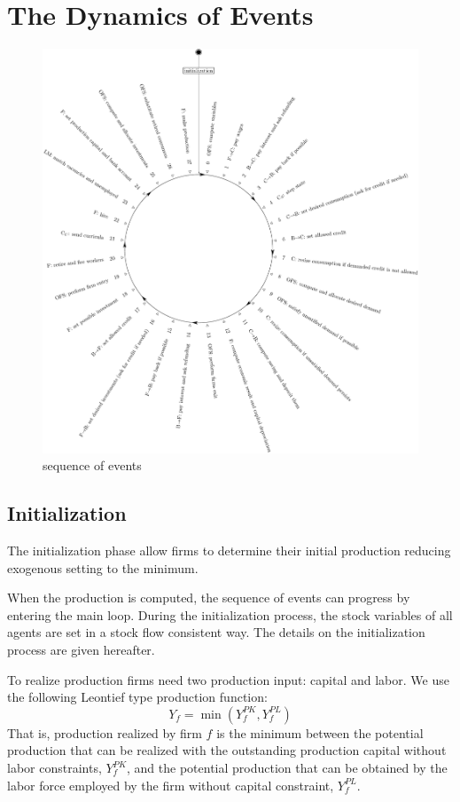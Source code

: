 \documentclass{book}
\begin{document}
\newpage
\chapter{The Dynamics of Events}\label{chap:events}

\begin{figure}[htp]
	\centering
\includegraphics[scale=0.5]{visual.pdf}
	\caption{sequence of events}
	\label{fig:sequence}
\end{figure}

\clearpage
\section{Initialization}
The initialization phase allow firms to determine their initial production reducing exogenous setting to the minimum. 

When the production is computed, the sequence of events can progress by entering the main loop. During the initialization process, the stock variables of all agents are set in a stock flow consistent way.
The details on the initialization process are given hereafter.

To realize production firms need two production input: capital and labor. We use the following Leontief type production function:
\[
Y_f=\min(Y_f^{PK},Y_f^{PL})
\]
That is, production realized by firm $f$ is the minimum between the potential production that can be realized with the outstanding production capital without labor constraints, $Y_f^{PK}$, and the potential production that can be obtained by the labor force employed by the firm without capital constraint, $Y_f^{PL}$. 
\end{document}
